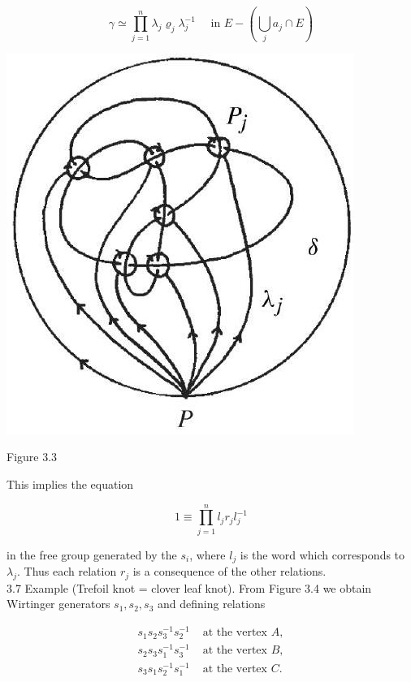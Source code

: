 \documentclass[10pt, letterpaper]{article}
\begin{document}
$$
\gamma \simeq \prod_{j=1}^{n} \lambda_{j} \varrho_{j} \lambda_{j}^{-1} \quad \text { in } E-\left(\bigcup_{j} a_{j} \cap E\right)
$$

\begin{center}
\includegraphics[scale=0.2]{2025_05_21_9c06be8de7a55410f8c1g-049}
\end{center}

Figure 3.3

This implies the equation

$$
1 \equiv \prod_{j=1}^{n} l_{j} r_{j} l_{j}^{-1}
$$

in the free group generated by the $s_{i}$, where $l_{j}$ is the word which corresponds to $\lambda_{j}$. Thus each relation $r_{j}$ is a consequence of the other relations.\\
3.7 Example (Trefoil knot = clover leaf knot). From Figure 3.4 we obtain Wirtinger generators $s_{1}, s_{2}, s_{3}$ and defining relations

$$
\begin{array}{ll}
s_{1} s_{2} s_{3}^{-1} s_{2}^{-1} & \text { at the vertex } A, \\
s_{2} s_{3} s_{1}^{-1} s_{3}^{-1} & \text { at the vertex } B, \\
s_{3} s_{1} s_{2}^{-1} s_{1}^{-1} & \text { at the vertex } C .
\end{array}
$$
\end{document}
